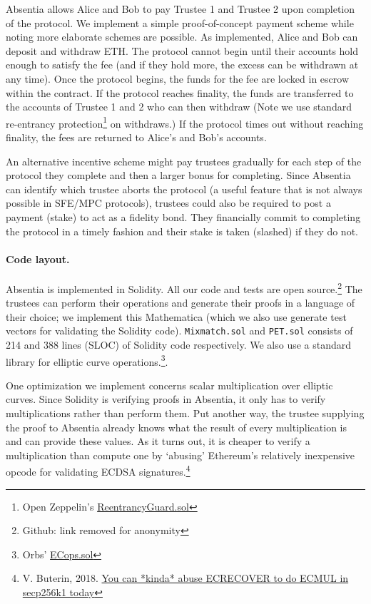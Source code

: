 Absentia allows Alice and Bob to pay Trustee 1 and Trustee 2 upon completion of the protocol. We implement a simple proof-of-concept payment scheme while noting more elaborate schemes are possible. As implemented, Alice and Bob can deposit and withdraw ETH. The protocol cannot begin until their accounts hold enough to satisfy the fee (and if they hold more, the excess can be withdrawn at any time). Once the protocol begins, the funds for the fee are locked in escrow within the contract. If the protocol reaches finality, the funds are transferred to the accounts of Trustee 1 and 2 who can then withdraw (Note we use standard re-entrancy protection\footnote{Open Zeppelin's \href{https://github.com/OpenZeppelin/openzeppelin-contracts/blob/master/contracts/utils/ReentrancyGuard.sol}{ReentrancyGuard.sol}} on withdraws.) If the protocol times out without reaching finality, the fees are returned to Alice's and Bob's accounts. 

An alternative incentive scheme might pay trustees gradually for each step of the protocol they complete and then a larger bonus for completing. Since Absentia can identify which trustee aborts the protocol (a useful feature that is not always possible in SFE/MPC protocols), trustees could also be required to post a payment (stake) to act as a fidelity bond. They financially commit to completing the protocol in a timely fashion and their stake is taken (slashed) if they do not.


\paragraph{Code layout.} 

Absentia is implemented in Solidity. All our code and tests are open source.\footnote{Github: link removed for anonymity} The trustees can perform their operations and generate their proofs in a language of their choice; we implement this Mathematica (which we also use generate test vectors for validating the Solidity code). \texttt{Mixmatch.sol} and \texttt{PET.sol} consists of 214 and 388 lines (SLOC) of Solidity code respectively. We also use a standard library for elliptic curve operations.\footnote{Orbs' \href{https://github.com/orbs-network/elliptic-curve-solidity/blob/master/ECops.sol}{ECops.sol}}. 

One optimization we implement concerns scalar multiplication over elliptic curves. Since Solidity is verifying proofs in Absentia, it only has to verify multiplications rather than perform them. Put another way, the trustee supplying the proof to Absentia already knows what the result of every multiplication is and can provide these values. As it turns out, it is cheaper to verify a multiplication than compute one by `abusing' Ethereum's relatively inexpensive opcode for validating ECDSA signatures.\footnote{V. Buterin, 2018. \href{https://ethresear.ch/t/you-can-kinda-abuse-ecrecover-to-do-ecmul-in-secp256k1-today/2384}{You can *kinda* abuse ECRECOVER to do ECMUL in secp256k1 today}}

